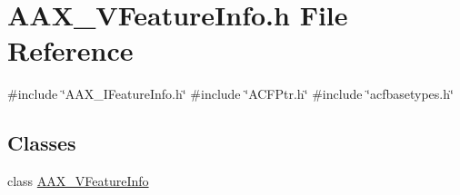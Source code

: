 \hypertarget{a00710}{}\section{A\+A\+X\+\_\+\+V\+Feature\+Info.\+h File Reference}
\label{a00710}
{\ttfamily \#include \char`\"{}A\+A\+X\+\_\+\+I\+Feature\+Info.\+h\char`\"{}}\newline
{\ttfamily \#include \char`\"{}A\+C\+F\+Ptr.\+h\char`\"{}}\newline
{\ttfamily \#include \char`\"{}acfbasetypes.\+h\char`\"{}}\newline
\subsection*{Classes}
\begin{DoxyCompactItemize}
\item 
class \mbox{\hyperlink{a01917}{A\+A\+X\+\_\+\+V\+Feature\+Info}}
\end{DoxyCompactItemize}
